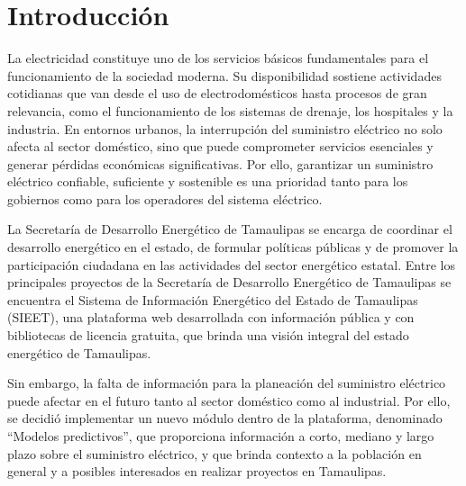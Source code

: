 
\section{Introducción} \label{sec:introduccion} %

La electricidad constituye uno de los servicios básicos fundamentales para el funcionamiento de la sociedad moderna. Su disponibilidad sostiene actividades cotidianas que van desde el uso de electrodomésticos hasta procesos de gran relevancia, como el funcionamiento de los sistemas de drenaje, los hospitales y la industria. En entornos urbanos, la interrupción del suministro eléctrico no solo afecta al sector doméstico, sino que puede comprometer servicios esenciales y generar pérdidas económicas significativas. Por ello, garantizar un suministro eléctrico confiable, suficiente y sostenible es una prioridad tanto para los gobiernos como para los operadores del sistema eléctrico.

La Secretaría de Desarrollo Energético de Tamaulipas se encarga de coordinar el desarrollo energético en el estado, de formular políticas públicas y de promover la participación ciudadana en las actividades del sector energético estatal. Entre los principales proyectos de la Secretaría de Desarrollo Energético de Tamaulipas se encuentra el Sistema de Información Energético del Estado de Tamaulipas (SIEET), una plataforma web desarrollada con información pública y con bibliotecas de licencia gratuita, que brinda una visión integral del estado energético de Tamaulipas.

Sin embargo, la falta de información para la planeación del suministro eléctrico puede afectar en el futuro tanto al sector doméstico como al industrial. Por ello, se decidió implementar un nuevo módulo dentro de la plataforma, denominado ``Modelos predictivos'', que proporciona información a corto, mediano y largo plazo sobre el suministro eléctrico, y que brinda contexto a la población en general y a posibles interesados en realizar proyectos en Tamaulipas.


